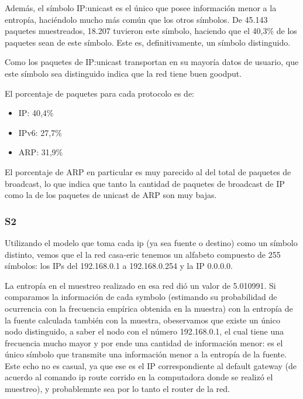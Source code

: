 Además, el símbolo IP:unicast es el único que posee información menor a la
entropía, haciéndolo mucho más común que los otros símbolos. De 45.143 paquetes
muestreados, 18.207 tuvieron este símbolo, haciendo que el 40,3\% de los paquetes
sean de este símbolo. Este es, definitivamente, un símbolo distinguido.

Como los paquetes de IP:unicast transportan en su mayoría datos de usuario,
que este símbolo sea distinguido indica que la red tiene buen goodput.


El porcentaje de paquetes para cada protocolo es de:
\begin{itemize}
	\item IP: 40,4\%
	\item IPv6: 27,7\%
	\item ARP: 31,9\%
\end{itemize}

El porcentaje de ARP en particular es muy parecido al del total de paquetes de
broadcast, lo que indica que tanto la cantidad de paquetes de broadcast de IP
como la de los paquetes de unicast de ARP son muy bajas.



\subsubsection{S2}

Utilizando el modelo que toma cada ip (ya sea fuente o destino) como
un símbolo distinto, vemos que el la red casa-eric tenemos un alfabeto
compuesto de 255 símbolos: los IPs del 192.168.0.1 a 192.168.0.254 y
la IP 0.0.0.0.

La entropía en el muestreo realizado en esa red dió un valor de
5.010991. Si comparamos la información de cada symbolo (estimando su
probabilidad de ocurrencia con la frecuencia empírica obtenida en la
muestra) con la entropía de la fuente calculada también con la
muestra, obeservamos que existe un único nodo distinguido, a saber el
nodo con el número 192.168.0.1, el cual tiene una frecuencia mucho
mayor y por ende una cantidad de información menor: es el único
símbolo que transmite una información menor a la entropía de la
fuente. Este echo no es casual, ya que ese es el IP correspondiente al
default gateway (de acuerdo al comando ip route corrido en la
computadora donde se realizó el muestreo), y probablemnte sea por lo
tanto el router de la red.

